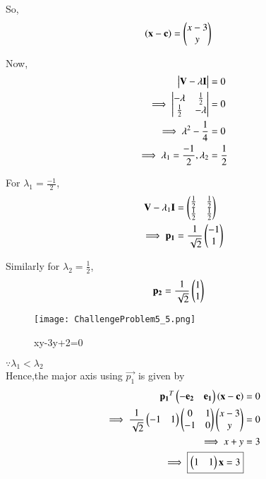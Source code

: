 \documentclass[journal,12pt,twocolumn]{IEEEtran}
\begin{document}
\begin{enumerate}
    So,
    \begin{align}
    \left(\mathbf{x}-\mathbf{c}\right) &= \begin{pmatrix}x-3 \\ y\end{pmatrix}
    \end{align}

    Now,
    \begin{align}
        \begin{vmatrix}\mathbf{V}-\lambda\mathbf{I}\end{vmatrix} &= 0 \\
        \implies \begin{vmatrix}-\lambda & \frac{1}{2} \\ \frac{1}{2} & -\lambda\end{vmatrix} &= 0 \\
        \implies \lambda^2-\frac{1}{4} &= 0 \\
        \implies \lambda_1 =\frac{-1}{2},\lambda_2 &= \frac{1}{2}
    \end{align}
    
    For $\lambda_1=\frac{-1}{2}$,
    \begin{align}
        \mathbf{V}-\lambda_1\mathbf{I} &= \begin{pmatrix}\frac{1}{2} & \frac{1}{2} \\ \frac{1}{2} & \frac{1}{2}\end{pmatrix} \\
        \implies \mathbf{p_1} &= \frac{1}{\sqrt{2}}\begin{pmatrix}-1 \\ 1\end{pmatrix}
    \end{align}
    
    Similarly for $\lambda_2=\frac{1}{2}$,
    \begin{align}
        \mathbf{p_2} &= \frac{1}{\sqrt{2}}\begin{pmatrix}1 \\ 1\end{pmatrix}
    \end{align}
    
    \begin{figure}[!ht]
    \centering
    \texttt{[image: ChallengeProblem5\_5.png]}
    \caption{xy-3y+2=0}
    \label{ex5}	
    \end{figure}
    
    $\because \lambda_1<\lambda_2$ \\
    Hence,the major axis using $\vec{p_1}$ is given by
    \begin{align}
        \mathbf{p_1}^T\begin{pmatrix}-\mathbf{e_2} & \mathbf{e_1}\end{pmatrix}\left(\mathbf{x}-\mathbf{c}\right) &= 0 \\
        \implies \frac{1}{\sqrt{2}}\begin{pmatrix}-1 & 1\end{pmatrix}\begin{pmatrix}0 & 1 \\ -1 & 0\end{pmatrix}\begin{pmatrix}x-3 \\ y\end{pmatrix} &= 0 \\
        \implies x+y &= 3 \\
        \implies \boxed{\begin{pmatrix}1 & 1\end{pmatrix}\mathbf{x} =3}
    \end{align}
    

\end{enumerate}
\end{document}
